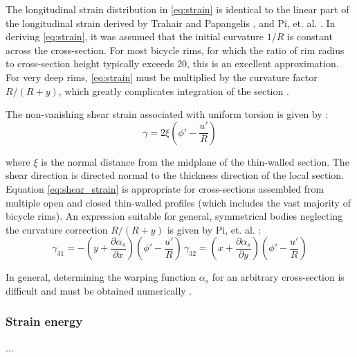 \documentclass[\rootdir/thesis.tex]{subfiles}
\begin{document}
The longitudinal strain distribution in \eqref{eq:strain} is identical to the linear part of the longitudinal strain derived by Trahair and Papangelis \cite{Trahair1987}, and Pi, et. al. \cite{Pi1995}. In deriving \eqref{eq:strain}, it was assumed that the initial curvature $1/R$ is constant across the cross-section. For most bicycle rims, for which the ratio of rim radius to cross-section height typically exceeds 20, this is an excellent approximation. For very deep rims, \eqref{eq:strain} must be multiplied by the curvature factor $R/(R+y)$, which greatly complicates integration of the section \cite{Kang1994,Lim2004,Ryu2012}.

The non-vanishing shear strain associated with uniform torsion is given by \cite{Timoshenko,Pi1995,Kang2004}:
\begin{equation}
\label{eq:shear_strain}
\gamma = 2 \xi \left(\phi' - \frac{u'}{R}\right)
\end{equation}

where $\xi$ is the normal distance from the midplane of the thin-walled section. The shear direction is directed normal to the thickness direction of the local section. Equation \eqref{eq:shear_strain} is appropriate for cross-sections assembled from multiple open and closed thin-walled profiles (which includes the vast majority of bicycle rims). An expression suitable for general, symmetrical bodies neglecting the curvature correction $R/(R+y)$ is given by Pi, et. al. \cite{Pi2006}:
\begin{equation}
\gamma_{31} = -\left(y + \frac{\partial \alpha_s}{\partial x}\right)\left(\phi' - \frac{u'}{R}\right)\,
\gamma_{32} = \left(x + \frac{\partial \alpha_s}{\partial y}\right)\left(\phi' - \frac{u'}{R}\right)
\end{equation}

In general, determining the warping function $\alpha_s$ for an arbitrary cross-section is difficult and must be obtained numerically \cite{warping}.


\subsubsection{Strain energy}
...


\end{document}
